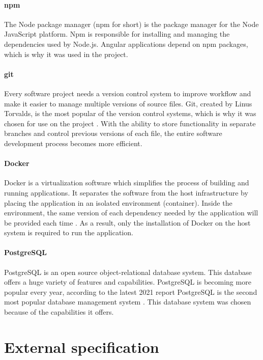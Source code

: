 \documentclass[a4paper,twoside,12pt]{book}
\begin{document}
\subsubsection{npm}
The Node package manager (npm for short) is the package manager for the Node JavaScript platform. Npm is responsible for installing and managing the dependencies used by Node.js. Angular applications depend on npm packages, which is why it was used in the project.

\subsubsection{git}
Every software project needs a version control system to improve workflow and make it easier to manage multiple versions of source files. Git, created by Linus Torvalds, is the most popular of the version control systems, which is why it was chosen for use on the project \cite{bib:stackSurvey}. With the ability to store functionality in separate branches and control previous versions of each file, the entire software development process becomes more efficient.

\subsubsection{Docker}
Docker is a virtualization software which simplifies the process of building and running applications. It separates the software from the host infrastructure by placing the application in an isolated environment (container). Inside the environment, the same version of each dependency needed by the application will be provided each time \cite{bib:dockerOverview}. As a result, only the installation of Docker on the host system is required to run the application.

\subsubsection{PostgreSQL}
PostgreSQL is an open source object-relational database system. This database offers a huge variety of features and capabilities. PostgreSQL is becoming more popular every year, according to the latest 2021 report PostgreSQL is the second most popular database management system \cite{bib:stackSurvey}. This database system was chosen because of the capabilities it offers.


\chapter{External specification}
\end{document}
